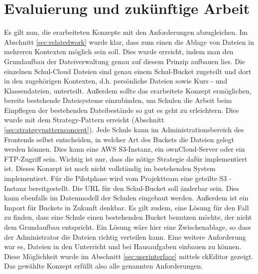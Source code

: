 \section{Evaluierung und zukünftige Arbeit}
\label{sec:evaluation}

Es gilt nun, die erarbeiteten Konzepte mit den Anforderungen abzugleichen. Im Abschnitt \ref{sec:relatedwork} wurde klar, dass zum einen die Ablage von Dateien in mehreren Kontexten möglich sein soll. Dies wurde erreicht, indem man den Grundaufbau der Dateiverwaltung genau auf diesem Prinzip aufbauen lies. Die einzelnen Schul-Cloud Dateien sind genau einem Schul-Bucket zugeteilt und dort in den zugehörigen Kontexten, d.h. persönliche Dateien sowie Kurs - und Klassendateien, unterteilt. Außerdem sollte das erarbeitete Konzept ermöglichen, bereits bestehende Dateisysteme einzubinden, um Schulen die Arbeit beim Einpflegen der bestehenden Dateibestände so gut es geht zu erleichtern. Dies wurde mit dem Strategy-Pattern erreicht (Abschnitt \ref{sec:strategypatternconcept}). Jede Schule kann im Administrationsbereich des Frontends selbst entscheiden, in welcher Art des Buckets die Dateien gelegt werden können. Dies kann eine AWS S3-Instanz, ein ownCloud-Server oder ein FTP-Zugriff sein. Wichtig ist nur, dass die nötige Strategie dafür implementiert ist. Dieses Konzept ist noch nicht vollständig im bestehenden System implementiert. Für die Pilotphase wird vom Projektteam eine geteilte S3 - Instanz bereitgestellt. Die URL für den Schul-Bucket soll änderbar sein. Dies kann ebenfalls im Datenmodell der Schulen eingebaut werden. Außerdem ist ein Import für Buckets in Zukunft denkbar.  Es gilt zudem, eine Lösung für den Fall zu finden, dass eine Schule einen bestehenden Bucket benutzen möchte, der nicht dem Grundaufbau entspricht. Ein Lösung wäre hier eine Zwischenablage, so dass der Administrator die Dateien richtig verteilen kann. Eine weitere Anforderung war es, Dateien in den Unterricht und bei Hausaufgaben einbauen zu können. Diese Möglichkeit wurde im Abschnitt \ref{sec:userinterface} mittels ckEditor gezeigt. Das gewählte Konzept erfüllt also alle genannten Anforderungen.

